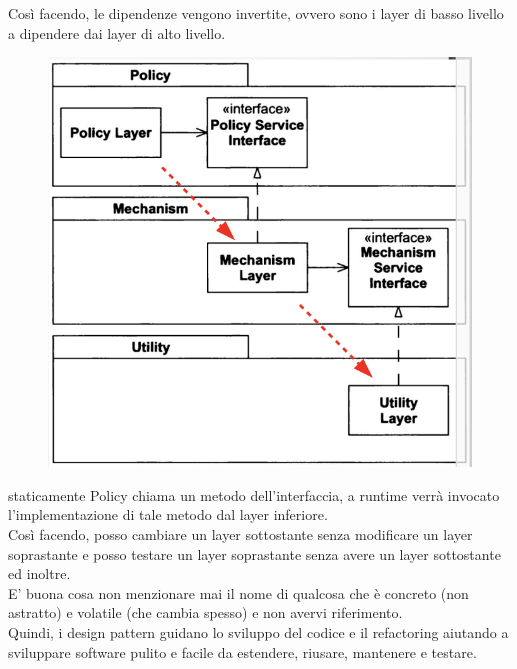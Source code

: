 Così facendo, le dipendenze vengono invertite, ovvero sono i layer di basso livello a dipendere dai layer di alto livello.\\
\begin{figure}[H]
  \centering
  \includegraphics[width=0.5\linewidth]{../immagini/principio_SOLID/architetturaOODIP}  
\end{figure}

staticamente Policy chiama un metodo dell'interfaccia, a runtime verrà invocato l'implementazione di tale metodo dal layer inferiore.\\
Così facendo, posso cambiare un layer sottostante senza modificare un layer soprastante e posso testare un layer soprastante senza avere un layer
sottostante ed inoltre.\\
E' buona cosa non menzionare mai il nome di qualcosa che è concreto (non astratto) e volatile (che cambia spesso) e non avervi riferimento.\\

Quindi, i design pattern guidano lo sviluppo del codice e il refactoring aiutando a sviluppare software pulito e facile da estendere, riusare, mantenere e testare.